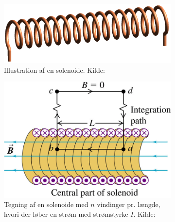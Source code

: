 \begin{figure}
    \centering
    \begin{subfigure}[t]{.47\textwidth}
        \includegraphics[width=\columnwidth]{opg/figurer/Solenoid-1.png}
        \caption{Illustration af en solenoide. Kilde: \cite{SolenoidWikipedia2019}}
        \label{fig:solenoide}
    \end{subfigure}
    \hfill
    \begin{subfigure}[t]{.47\textwidth}
        \includegraphics[width=\columnwidth]{opg/figurer/solenoid.png}
        \caption{Tegning af en solenoide med $n$ vindinger pr. længde, hvori der løber en strøm med strømstyrke $I$. Kilde: \cite{UY1ApplicationsAmpere2015}}
        \label{fig:solenoide_ampere}
    \end{subfigure}
    \caption{ }
\end{figure}
